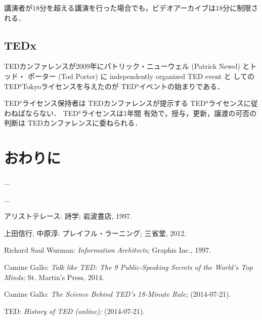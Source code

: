 \documentclass[submit,techreq,noauthor]{ipsj}
\newcommand{\TED}{\textsf{TED}}
\newcommand{\TEDx}{\TED${}^{\textsf{x}}$}
\newcommand{\TEDxTokyo}{\TEDx\textsf{Tokyo}}
\begin{document}
講演者が18分を超える講演を行った場合でも，ビデオアーカイブは18分に制限される．



\subsection{TEDx}

\TED カンファレンスが2009年にパトリック・ニューウェル (Patrick Newel) とトッド・
ポーター (Tod Porter) に independently organized TED event と
しての \TEDxTokyo ライセンスを与えたのが \TEDx イベントの始まりである．

\TEDx ライセンス保持者は \TED カンファレンスが提示する \TEDx ライセンスに従わねばならない． \TEDx ライセンスは1年間
有効で，授与，更新，譲渡の可否の判断は \TED カンファレンスに委ねられる．





\section{おわりに}

...

\begin{acknowledgment}
...
\end{acknowledgment}



\begin{thebibliography}{10}

アリストテレース: 詩学; 岩波書店, 1997.

上田信行, 中原淳: プレイフル・ラーニング; 三省堂, 2012.

Richard Saul Wurman: \textit{Information Architects;}
Graphis Inc., 1997.

Camine Gallo: \textit{Talk like TED: The 9 Public-Speaking Secrets of the World's Top Minds;}
St. Martin's Press, 2014.

Camine Gallo: \textit{The Science Behind TED's 18-Minute Rule;}
(2014-07-21).

TED: \textit{History of TED (online);}
 (2014-07-21).

\end{thebibliography}
\end{document}
